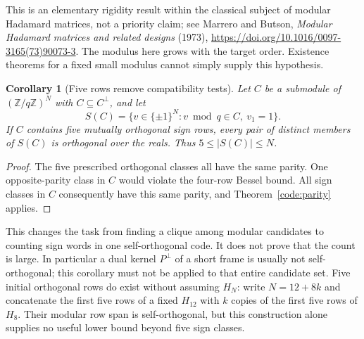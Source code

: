 \documentclass[11pt]{article}
\newtheorem{corollary}[theorem]{Corollary}
\begin{document}
This is an elementary rigidity result within the classical subject
of modular Hadamard matrices, not a priority claim; see Marrero and
Butson, \emph{Modular Hadamard matrices and related designs} (1973),
\url{https://doi.org/10.1016/0097-3165(73)90073-3}.
The modulus here grows with the target order. Existence theorems
for a fixed small modulus cannot simply supply this hypothesis.

\begin{corollary}[Five rows remove compatibility tests]\label{code:five}
Let $C$ be a submodule of $(\mathbb Z/q\mathbb Z)^N$ with
$C\subseteq C^\perp$, and let
\[
 S(C)=\{v\in\{\pm1\}^N:v\bmod q\in C,\ v_1=1\}.
\]
If $C$ contains five mutually orthogonal sign rows, every pair of
distinct members of $S(C)$ is orthogonal over the reals.
Thus $5\le |S(C)|\le N$.
\end{corollary}
\begin{proof}
The five prescribed orthogonal classes all have the same parity.
One opposite-parity class in $C$ would violate the four-row Bessel
bound. All sign classes in $C$ consequently have this same parity,
and Theorem~\ref{code:parity} applies.
\end{proof}

This changes the task from finding a clique among modular candidates
to counting sign words in one self-orthogonal code. It does not prove
that the count is large. In particular a dual kernel $P^\perp$ of a
short frame is usually not self-orthogonal; this corollary must not
be applied to that entire candidate set.
Five initial orthogonal rows do exist without assuming $H_N$:
write $N=12+8k$ and concatenate the first five rows of a fixed
$H_{12}$ with $k$ copies of the first five rows of $H_8$.
Their modular row span is self-orthogonal, but this construction
alone supplies no useful lower bound beyond five sign classes.
\end{document}

